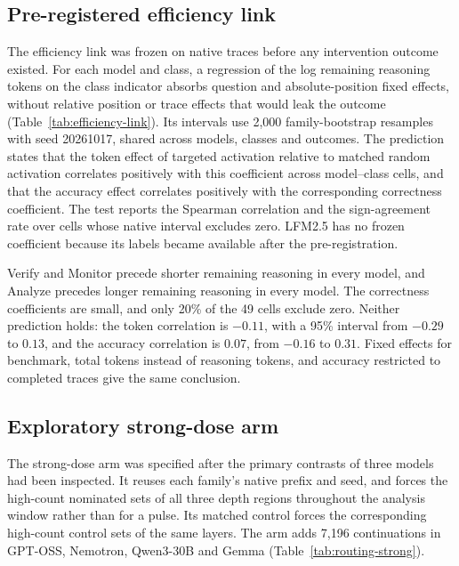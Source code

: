 \subsection{Pre-registered efficiency link}
\label{app:efficiency-link}

The efficiency link was frozen on native traces before any intervention outcome existed.
%
For each model and class, a regression of the log remaining reasoning tokens on the class indicator absorbs question and absolute-position fixed effects, without relative position or trace effects that would leak the outcome (Table~\ref{tab:efficiency-link}).
%
Its intervals use 2,000 family-bootstrap resamples with seed 20261017, shared across models, classes and outcomes.
%
The prediction states that the token effect of targeted activation relative to matched random activation correlates positively with this coefficient across model--class cells, and that the accuracy effect correlates positively with the corresponding correctness coefficient.
%
The test reports the Spearman correlation and the sign-agreement rate over cells whose native interval excludes zero.
%
LFM2.5 has no frozen coefficient because its labels became available after the pre-registration.
%



Verify and Monitor precede shorter remaining reasoning in every model, and Analyze precedes longer remaining reasoning in every model.
%
The correctness coefficients are small, and only 20\% of the 49 cells exclude zero.
%
Neither prediction holds: the token correlation is $-0.11$, with a 95\% interval from $-0.29$ to $0.13$, and the accuracy correlation is $0.07$, from $-0.16$ to $0.31$.
%
Fixed effects for benchmark, total tokens instead of reasoning tokens, and accuracy restricted to completed traces give the same conclusion.
%

\subsection{Exploratory strong-dose arm}
\label{app:routing-strong}

The strong-dose arm was specified after the primary contrasts of three models had been inspected.
%
It reuses each family's native prefix and seed, and forces the high-count nominated sets of all three depth regions throughout the analysis window rather than for a pulse.
%
Its matched control forces the corresponding high-count control sets of the same layers.
%
The arm adds 7,196 continuations in GPT-OSS, Nemotron, Qwen3-30B and Gemma (Table~\ref{tab:routing-strong}).
%

